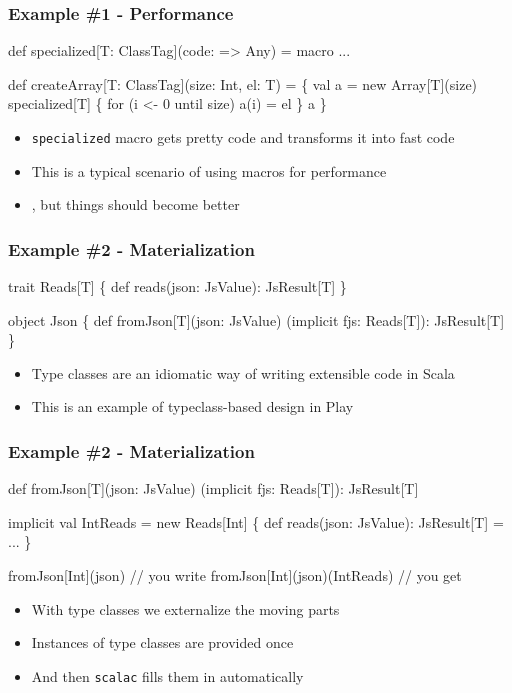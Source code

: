 \documentclass[svgnames,hyperref={bookmarks=false}]{beamer}
\begin{document}
\begin{frame}[fragile]
\frametitle{Example \#1 - Performance}

\begin{semiverbatim}
\alert{def specialized[T: ClassTag](code: => Any) = macro ...}

def createArray[T: ClassTag](size: Int, el: T) = \{
  val a = new Array[T](size)
  \alert{specialized[T] \{}
    for (i <- 0 until size) a(i) = el
  \alert{\}}
  a
\}
\end{semiverbatim}

\begin{itemize}
\item \texttt{specialized} macro gets pretty code and transforms it into fast code
\item This is a typical scenario of using macros for performance
\item {}, but things should become better
\end{itemize}
\end{frame}

\begin{frame}[fragile]
\frametitle{Example \#2 - Materialization}

\begin{semiverbatim}
trait Reads[T] \{
  def reads(json: JsValue): JsResult[T]
\}

object Json \{
  def fromJson[T](json: JsValue)
    (implicit fjs: Reads[T]): JsResult[T]
\}

\end{semiverbatim}

\begin{itemize}
\item Type classes are an idiomatic way of writing extensible code in Scala
\item This is an example of typeclass-based design in Play
\end{itemize}
\end{frame}

\begin{frame}[fragile]
\frametitle{Example \#2 - Materialization}

\begin{semiverbatim}
def fromJson[T](json: JsValue)
  (implicit fjs: Reads[T]): JsResult[T]

implicit val IntReads = new Reads[Int] \{
  def reads(json: JsValue): JsResult[T] = ...
\}

fromJson[Int](json) // you write
fromJson[Int](json)(IntReads) // you get

\end{semiverbatim}

\begin{itemize}
\item With type classes we externalize the moving parts
\item Instances of type classes are provided once
\item And then \texttt{scalac} fills them in automatically
\end{itemize}
\end{frame}
\end{document}
